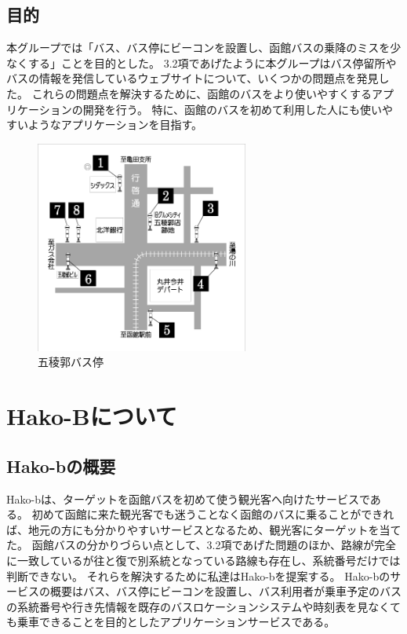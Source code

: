 \documentclass[openany,11pt,papersize]{jsbook}
\begin{document}

\section{目的}\label{sec:gaiyou}
本グループでは「バス、バス停にビーコンを設置し、函館バスの乗降のミスを少なくする」ことを目的とした。
3.2項であげたように本グループはバス停留所やバスの情報を発信しているウェブサイトについて、いくつかの問題点を発見した。
これらの問題点を解決するために、函館のバスをより使いやすくするアプリケーションの開発を行う。
特に、函館のバスを初めて利用した人にも使いやすいようなアプリケーションを目指す。


\begin{figure}[htbp]
  \begin{center}
    \includegraphics[clip,width=7.0cm]{img/14007.jpg}
    \caption{五稜郭バス停}
    \label{fig:goryo}
  \end{center}
\end{figure}

\chapter{Hako-Bについて}

\section{Hako-bの概要}
Hako-bは、ターゲットを函館バスを初めて使う観光客へ向けたサービスである。
初めて函館に来た観光客でも迷うことなく函館のバスに乗ることができれば、地元の方にも分かりやすいサービスとなるため、観光客にターゲットを当てた。
函館バスの分かりづらい点として、3.2項であげた問題のほか、路線が完全に一致しているが往と復で別系統となっている路線も存在し、系統番号だけでは判断できない。
それらを解決するために私達はHako-bを提案する。
Hako-bのサービスの概要はバス、バス停にビーコンを設置し、バス利用者が乗車予定のバスの系統番号や行き先情報を既存のバスロケーションシステムや時刻表を見なくても乗車できることを目的としたアプリケーションサービスである。
\end{document}
